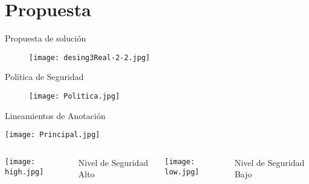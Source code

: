  \section{Propuesta}
	
\begin{frame}{Propuesta de solución}
	\begin{figure}[t!]
		\begin{center} 
		\texttt{[image: desing3Real-2-2.jpg]} 
		\end{center}
	\end{figure}
\end{frame}

\begin{frame}{Política de Seguridad}
	\begin{figure}[t!]
		\begin{center} 
		\texttt{[image: Politica.jpg]} 
		\end{center}
	\end{figure}
\end{frame}

\begin{frame}{Lineamientos de Anotación}
	\begin{center}
		\texttt{[image: Principal.jpg]}
	\end{center}
	
		\begin{columns}[c]
			\column{1.5in}
				\begin{center}
	 			\texttt{[image: high.jpg]}
				\end{center}
				Nivel de Seguridad Alto
	 		\column{1.5in}
	 		\begin{center} 
	 			\texttt{[image: low.jpg]}
	 			\end{center}
	 			Nivel de Seguridad Bajo\newline
	 			
		\end{columns}
\end{frame}
	
